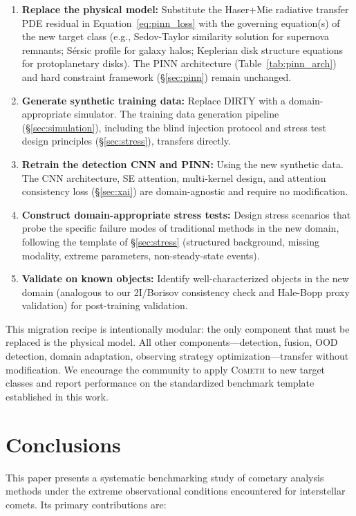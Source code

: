 \documentclass[preprint2]{aastex631}
\begin{document}
\begin{enumerate}
    \item \textbf{Replace the physical model:} Substitute the Haser+Mie radiative transfer PDE residual in Equation~\ref{eq:pinn_loss} with the governing equation(s) of the new target class (e.g., Sedov-Taylor similarity solution for supernova remnants; S\'ersic profile for galaxy halos; Keplerian disk structure equations for protoplanetary disks). The PINN architecture (Table~\ref{tab:pinn_arch}) and hard constraint framework (\S\ref{sec:pinn}) remain unchanged.
    \item \textbf{Generate synthetic training data:} Replace DIRTY with a domain-appropriate simulator. The training data generation pipeline (\S\ref{sec:simulation}), including the blind injection protocol and stress test design principles (\S\ref{sec:stress}), transfers directly.
    \item \textbf{Retrain the detection CNN and PINN:} Using the new synthetic data. The CNN architecture, SE attention, multi-kernel design, and attention consistency loss (\S\ref{sec:xai}) are domain-agnostic and require no modification.
    \item \textbf{Construct domain-appropriate stress tests:} Design stress scenarios that probe the specific failure modes of traditional methods in the new domain, following the template of \S\ref{sec:stress} (structured background, missing modality, extreme parameters, non-steady-state events).
    \item \textbf{Validate on known objects:} Identify well-characterized objects in the new domain (analogous to our 2I/Borisov consistency check and Hale-Bopp proxy validation) for post-training validation.
\end{enumerate}

This migration recipe is intentionally modular: the only component that must be replaced is the physical model. All other components---detection, fusion, OOD detection, domain adaptation, observing strategy optimization---transfer without modification. We encourage the community to apply \textsc{Cometh} to new target classes and report performance on the standardized benchmark template established in this work.

\section{Conclusions}\label{sec:conclusions}

This paper presents a systematic benchmarking study of cometary analysis methods under the extreme observational conditions encountered for interstellar comets. Its primary contributions are:
\end{document}
